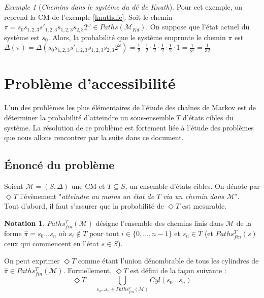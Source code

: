 \documentclass[12pt,a4paper]{report}
\theoremstyle{definition}%
\newtheorem*{notation}{Notation}
\theoremstyle{remark}
\newtheorem{example}{Exemple}[chapter]
\begin{document}
\begin{example}[\textit{Chemins dans le système du dé de Knuth}]
	Pour cet exemple, on reprend la CM de l'exemple \ref{knuthdie}. Soit le chemin $\pi = s_0 s_{1,2,3} s'_{1, 2, 3} s_{1,2,3} s_{2,3} 2^\omega \in Paths(\mathcal{M}_{Kd})$.
	On suppose que l'état actuel du système est $s_0$. Alors, la probabilité que le système emprunte le chemin $\pi$ est $\Delta(\pi) = \Delta(s_0 s_{1,2,3} s'_{1, 2, 3} s_{1,2,3} s_{2,3} 2^\omega) = \frac{1}{2} \cdot \frac{1}{2} \cdot \frac{1}{2} \cdot \frac{1}{2} \cdot \frac{1}{2} \cdot 1 = \frac{1}{2^5} = \frac{1}{32}$
\end{example}

\section{Problème d'accessibilité} \label{accCM}

L'un des problèmes les plus élémentaires de l'étude des chaînes de Markov est de déterminer la probabilité d'atteindre un sous-ensemble $T$ d'états cibles du système. La résolution de ce problème est fortement liée à l'étude des problèmes que nous allons rencontrer par la suite dans ce document.

\subsection{\'Enoncé du problème}
Soient $\mathcal{M} = (S, \Delta)$ une CM et $T \subseteq S$, un ensemble d'états cibles. On dénote par $\Diamond T$ l'évènement "\textit{atteindre au moins un état de $T$ via un chemin dans $\mathcal{M}$}". \\
Tout d'abord, il faut s'assurer que la probabilité de $\Diamond T$ est mesurable.
\begin{notation} $Paths_{fin}^T(\mathcal{M})$ désigne l'ensemble des chemins finis dans $\mathcal{M}$ de la forme $\hat{\pi} = s_0 \dots s_n$ où $s_i \notin T \text{ pour tout } i \in \{0, \dots, n-1\}$ et $s_n \in T$ (et $Paths_{fin}^T(s)$ ceux qui commencent en l'état $s \in S$).
\end{notation}
On peut exprimer $\Diamond T$ comme étant l'union dénombrable de tous les cylindres de $\hat{\pi} \in Paths_{fin}^T(\mathcal{M})$. Formellement, $\Diamond T$ est défini de la façon suivante :
\[
	\Diamond T = \bigcup_{s_0 \dots s_n \in Paths_{fin}^T(\mathcal{M})} Cyl(s_0 \dots s_n)
\]
\end{document}
